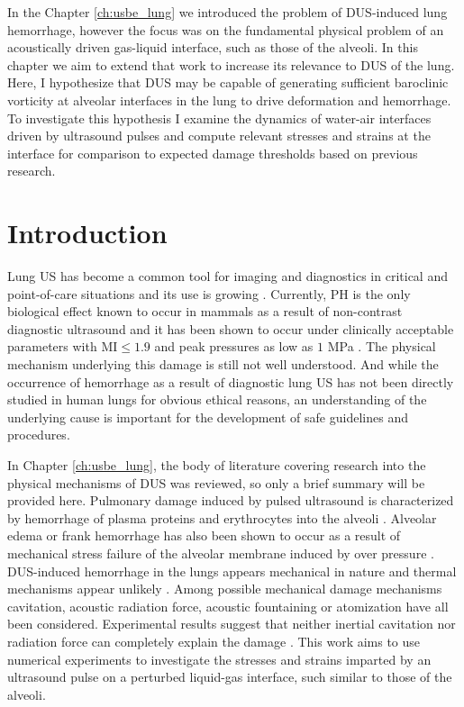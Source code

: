 In the Chapter \ref{ch:usbe_lung} we introduced the problem of
\ac{DUS}-induced lung hemorrhage, however the focus was on the
fundamental physical problem of an acoustically driven gas-liquid
interface, such as those of the alveoli. In this chapter we aim to
extend that work to increase its relevance to \ac{DUS} of the
lung. Here, I hypothesize that \ac{DUS} may be capable of generating
sufficient baroclinic vorticity at alveolar interfaces in the lung to
drive deformation and hemorrhage. To investigate this hypothesis I
examine the dynamics of water-air interfaces driven by ultrasound
pulses and compute relevant stresses and strains at the interface for
comparison to expected damage thresholds based on previous research.

\section{Introduction}
Lung \ac{US} has become a common tool for imaging and diagnostics in
critical and point-of-care situations and its use is growing
\citep{Lichtenstein2009}. Currently, \ac{PH} is the only biological
effect known to occur in mammals as a result of non-contrast
diagnostic ultrasound and it has been shown to occur under clinically
acceptable parameters with \ac{MI}$\leq1.9$ \citep{FDA1997} and peak
pressures as low as $1$ MPa \citep{Dalecki1997}. The physical
mechanism underlying this damage is still not well understood. And
while the occurrence of hemorrhage as a result of diagnostic lung
\ac{US} has not been directly studied in human lungs for obvious
ethical reasons, an understanding of the underlying cause is important
for the development of safe guidelines and procedures.

In Chapter \ref{ch:usbe_lung}, the body of literature covering
research into the physical mechanisms of \ac{DUS} was reviewed, so
only a brief summary will be provided here. Pulmonary damage induced
by pulsed ultrasound is characterized by hemorrhage of plasma proteins
and erythrocytes into the alveoli \cite{Penney1993a}. Alveolar edema
or frank hemorrhage has also been shown to occur as a result of
mechanical stress failure of the alveolar membrane induced by over
pressure \citep{West1991}. \ac{DUS}-induced hemorrhage in the lungs
appears mechanical in nature and thermal mechanisms appear unlikely
\citep{Zachary2006, Dalecki2004}. Among possible mechanical damage
mechanisms cavitation, acoustic radiation force, acoustic fountaining
or atomization have all been considered. Experimental results suggest
that neither inertial cavitation nor radiation force can completely
explain the damage \citep{OBrien2000, Raeman1996, Miller2016}. This
work aims to use numerical experiments to investigate the stresses and
strains imparted by an ultrasound pulse on a perturbed liquid-gas
interface, such similar to those of the alveoli.

